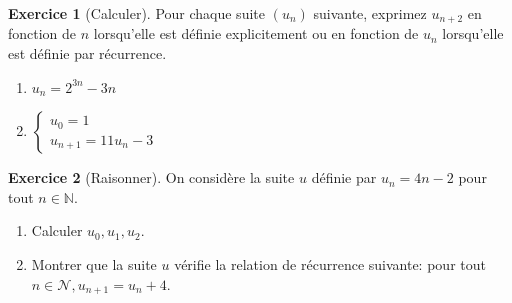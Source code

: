 \documentclass{exam}
\theoremstyle{definition}
\newtheorem{exercice}{Exercice}
\begin{document}
\begin{exercice}[Calculer]
    Pour chaque suite $(u_n)$ suivante, exprimez $u_{n+2}$ en fonction de $n$ lorsqu'elle est définie explicitement ou en fonction de $u_n$ lorsqu'elle est définie par récurrence.
    \begin{enumerate}
        \item $u_n = 2^{3n} - 3n$
        \item $\begin{cases} u_0 = 1\\ u_{n+1} = 11 u_n - 3\end{cases}$
    \end{enumerate}
    \begin{center}
    \end{center}
\end{exercice}

\begin{exercice}[Raisonner]
    On considère la suite $u$ définie par $u_n = 4n - 2$ pour tout $n \in \mathbb{N}$.
    \begin{enumerate}
        \item Calculer $u_0, u_1, u_2$.
        \item Montrer que la suite $u$ vérifie la relation de récurrence suivante: pour tout $n \in \mathcal{N}, u_{n+1} = u_n + 4$.
    \end{enumerate}
    \begin{center}
    \end{center}
\end{exercice}
\end{document}
